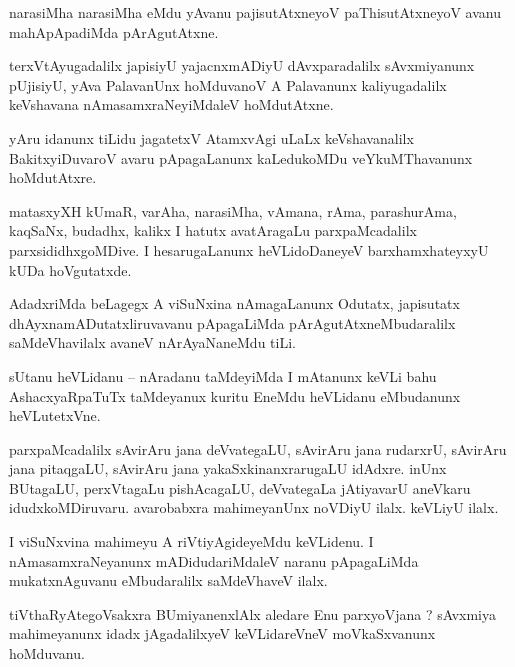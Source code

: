 \documentclass{article}
\begin{document}
\begin{mn}%
narasiMha narasiMha eMdu yAvanu pajisutAtxneyoV paThisutAtxneyoV avanu mahApApadiMda pArAgutAtxne.
\end{mn}

\begin{mn}%
terxVtAyugadalilx japisiyU yajacnxmADiyU dAvxparadalilx sAvxmiyanunx pUjisiyU, yAva PalavanUnx 
hoMduvanoV A Palavanunx kaliyugadalilx keVshavana nAmasamxraNeyiMdaleV hoMdutAtxne.
\end{mn}

\begin{mn}%
yAru idanunx tiLidu jagatetxV AtamxvAgi uLaLx keVshavanalilx BakitxyiDuvaroV avaru pApagaLanunx 
kaLedukoMDu veYkuMThavanunx hoMdutAtxre.
\end{mn}

\begin{mn}%
matasxyXH kUmaR, varAha, narasiMha, vAmana, rAma, parashurAma, kaqSaNx, budadhx, kalikx I hatutx 
avatAragaLu parxpaMcadalilx parxsididhxgoMDive. I hesarugaLanunx heVLidoDaneyeV barxhamxhateyxyU 
kUDa hoVgutatxde.
\end{mn}

\begin{mn}%
AdadxriMda beLagegx A viSuNxina nAmagaLanunx Odutatx, japisutatx dhAyxnamADutatxliruvavanu 
pApagaLiMda pArAgutAtxneMbudaralilx saMdeVhavilalx avaneV nArAyaNaneMdu tiLi.
\end{mn}

\begin{mn}%
sUtanu heVLidanu -- nAradanu taMdeyiMda I mAtanunx keVLi bahu AshacxyaRpaTuTx taMdeyanux kuritu 
EneMdu heVLidanu eMbudanunx heVLutetxVne.
\end{mn}

\begin{mn}%
parxpaMcadalilx sAvirAru jana deVvategaLU, sAvirAru jana rudarxrU, sAvirAru jana pitaqgaLU, 
sAvirAru jana yakaSxkinanxrarugaLU idAdxre. inUnx BUtagaLU, perxVtagaLu pishAcagaLU, deVvategaLa 
jAtiyavarU aneVkaru idudxkoMDiruvaru. avarobabxra mahimeyanUnx noVDiyU ilalx. keVLiyU ilalx.
\end{mn}

\begin{mn}%
I viSuNxvina mahimeyu A riVtiyAgideyeMdu keVLidenu. I nAmasamxraNeyanunx mADidudariMdaleV naranu 
pApagaLiMda mukatxnAguvanu eMbudaralilx saMdeVhaveV ilalx.
\end{mn}

\begin{mn}%
tiVthaRyAtegoVsakxra BUmiyanenxlAlx aledare Enu parxyoVjana ? sAvxmiya mahimeyanunx idadx 
jAgadalilxyeV keVLidareVneV moVkaSxvanunx hoMduvanu.
\end{mn}
\end{document}
